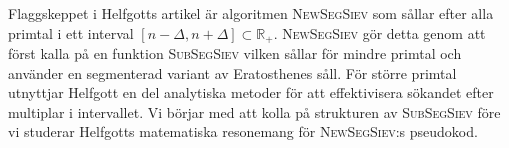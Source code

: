 

Flaggskeppet i Helfgotts artikel är algoritmen \textsc{NewSegSiev} som sållar efter alla primtal i ett interval \([n - \Delta, n + \Delta] \subset \mathbb{R}_+\). \textsc{NewSegSiev} gör detta genom att först kalla på en funktion \textsc{SubSegSiev} vilken sållar för mindre primtal och använder en segmenterad variant av Eratosthenes såll. För större primtal utnyttjar Helfgott en del analytiska metoder för att effektivisera sökandet efter multiplar i intervallet. Vi börjar med att kolla på strukturen av \textsc{SubSegSiev} före vi studerar Helfgotts matematiska resonemang för \textsc{NewSegSiev}:s pseudokod.